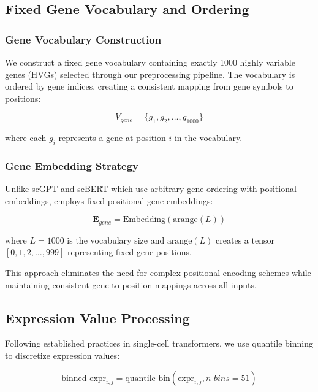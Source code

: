 \subsection{Fixed Gene Vocabulary and Ordering}

\subsubsection{Gene Vocabulary Construction}

We construct a fixed gene vocabulary containing exactly 1000 highly variable genes (HVGs) selected through our preprocessing pipeline. The vocabulary is ordered by gene indices, creating a consistent mapping from gene symbols to positions:

\begin{equation}
V_{gene} = \{g_1, g_2, \ldots, g_{1000}\}
\end{equation}

where each $g_i$ represents a gene at position $i$ in the vocabulary.

\subsubsection{Gene Embedding Strategy}

Unlike scGPT and scBERT which use arbitrary gene ordering with positional embeddings, \bioformer{} employs fixed positional gene embeddings:

\begin{equation}
\mathbf{E}_{gene} = \text{Embedding}(\text{arange}(L))
\end{equation}

where $L = 1000$ is the vocabulary size and $\text{arange}(L)$ creates a tensor $[0, 1, 2, \ldots, 999]$ representing fixed gene positions.

This approach eliminates the need for complex positional encoding schemes while maintaining consistent gene-to-position mappings across all inputs.

\subsection{Expression Value Processing}

Following established practices in single-cell transformers, we use quantile binning to discretize expression values:

\begin{equation}
\text{binned\_expr}_{i,j} = \text{quantile\_bin}(\text{expr}_{i,j}, n\_bins=51)
\end{equation}

